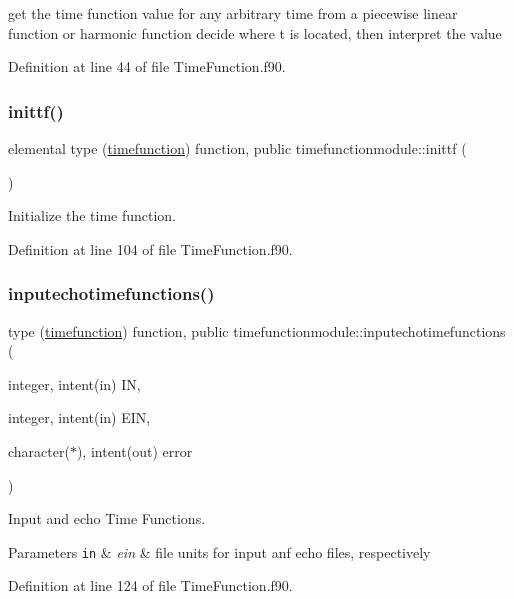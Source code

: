 get the time function value for any arbitrary time from a piecewise linear function or harmonic function decide where t is located, then interpret the value 



Definition at line 44 of file Time\+Function.\+f90.

\mbox{\label{namespacetimefunctionmodule_a4a9a0cfa8fd5fc6dcfd21c0eeed2a027}} 
\subsubsection{\texorpdfstring{inittf()}{inittf()}}
{\footnotesize\ttfamily elemental type (\hyperlink{structtimefunctionmodule_1_1timefunction}{timefunction}) function, public timefunctionmodule\+::inittf (\begin{DoxyParamCaption}{ }\end{DoxyParamCaption})}



Initialize the time function. 



Definition at line 104 of file Time\+Function.\+f90.

\mbox{\label{namespacetimefunctionmodule_a9dc9317deeac617a45cf48f6101f11d2}} 
\subsubsection{\texorpdfstring{inputechotimefunctions()}{inputechotimefunctions()}}
{\footnotesize\ttfamily type (\hyperlink{structtimefunctionmodule_1_1timefunction}{timefunction}) function, public timefunctionmodule\+::inputechotimefunctions (\begin{DoxyParamCaption}\item[{integer, intent(in)}]{IN,  }\item[{integer, intent(in)}]{E\+IN,  }\item[{character($\ast$), intent(out)}]{error }\end{DoxyParamCaption})}



Input and echo Time Functions. 


\begin{DoxyParams}[1]{Parameters}
\mbox{\tt in}  & {\em ein} & file units for input anf echo files, respectively \\
\hline
\end{DoxyParams}


Definition at line 124 of file Time\+Function.\+f90.

